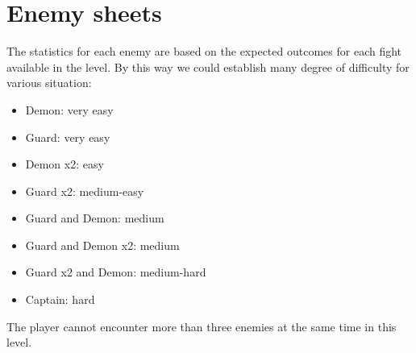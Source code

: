 \section{Enemy sheets}

The statistics for each enemy are based on the expected outcomes for each fight available in the level. By this way we could establish many degree of difficulty for various situation:
\begin{itemize}
\item Demon: very easy
\item Guard: very easy
\item Demon x2: easy
\item Guard x2: medium-easy
\item Guard and Demon: medium
\item Guard and Demon x2: medium
\item Guard x2 and Demon: medium-hard
\item Captain: hard
\end{itemize}

The player cannot encounter more than three enemies at the same time in this level.

